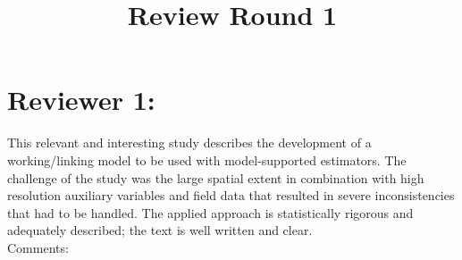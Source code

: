 \documentclass{article}
\title{Review Round 1\\\vspace{1cm}}
\author{}
\begin{document}

\maketitle
\thispagestyle{empty}
\newpage

\setcounter{page}{1}

\pagestyle{fancy} %
\fancyfoot[C]{\thepage}
\setlength{\headsep}{15mm}

\newcommand{\answer}[1]{\small \color{mybrown}{#1} \color{black}}
\newcommand{\note}[1]{\textit{\small \color{amaranth} \textbf{Note:} #1} \color{black}}
\newcommand{\todo}[1]{\color{red}{#1} \color{black}}



\section*{Reviewer 1:}

This relevant and interesting study describes the development of a working/linking model to be used with model-supported estimators. The challenge of the study was the large spatial extent in combination with high resolution auxiliary variables and field data that resulted in severe inconsistencies that had to be handled. The applied approach is statistically rigorous and adequately described; the text is well written and clear.\\

Comments:\\
\end{document}

